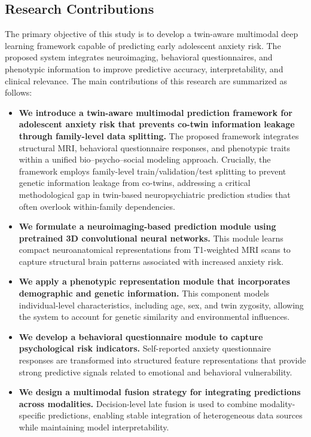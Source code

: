 \documentclass[10pt,letterpaper]{article}
\begin{document}
\subsection*{Research Contributions}

The primary objective of this study is to develop a twin-aware
multimodal deep learning framework capable of predicting early
adolescent anxiety risk. The proposed system integrates
neuroimaging, behavioral questionnaires, and phenotypic
information to improve predictive accuracy, interpretability,
and clinical relevance. The main contributions of this research
are summarized as follows:

\begin{itemize}

\item \textbf{We introduce a twin-aware multimodal prediction framework for adolescent anxiety risk that prevents co-twin information leakage through family-level data splitting.}  
The proposed framework integrates structural MRI, behavioral questionnaire responses, and phenotypic traits within a unified bio--psycho--social modeling approach. Crucially, the framework employs family-level train/validation/test splitting to prevent genetic information leakage from co-twins, addressing a critical methodological gap in twin-based neuropsychiatric prediction studies that often overlook within-family dependencies.

\item \textbf{We formulate a neuroimaging-based prediction module using pretrained 3D convolutional neural networks.}  
This module learns compact neuroanatomical representations from T1-weighted MRI scans to capture structural brain patterns associated with increased anxiety risk.

\item \textbf{We apply a phenotypic representation module that incorporates demographic and genetic information.}  
This component models individual-level characteristics, including age, sex, and twin zygosity, allowing the system to account for genetic similarity and environmental influences.

\item \textbf{We develop a behavioral questionnaire module to capture psychological risk indicators.}  
Self-reported anxiety questionnaire responses are transformed into structured feature representations that provide strong predictive signals related to emotional and behavioral vulnerability.

\item \textbf{We design a multimodal fusion strategy for integrating predictions across modalities.}  
Decision-level late fusion is used to combine modality-specific predictions, enabling stable integration of heterogeneous data sources while maintaining model interpretability.

\end{itemize}
\end{document}
